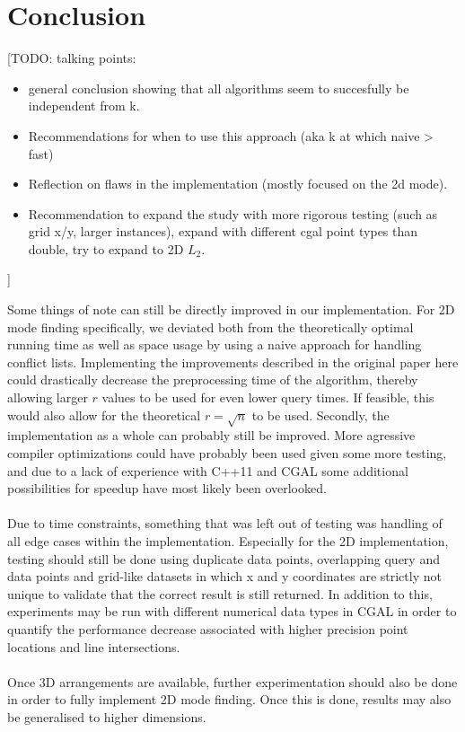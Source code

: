 \documentclass{article}
\newcommand{\todo}[1]{{\color{red}[#1]}}
\newcommand{\fb}[1]{{\color{blue}#1}}
\begin{document}
\section{Conclusion}
\todo{TODO: talking points:
    \begin{itemize}
        \item general conclusion showing that all algorithms seem to succesfully be
              independent from k.
        \item Recommendations for when to use this approach (aka k at which naive > fast)
        \item Reflection on flaws in the implementation (mostly focused on the 2d mode).
        \item Recommendation to expand the study with more rigorous testing (such as grid
              x/y, larger instances), expand with different cgal point types than double, try
              to expand to 2D $L_2$.
    \end{itemize}
}

\fb{
    Some things of note can still be directly improved in our implementation. For 2D mode finding specifically, we deviated both from the theoretically optimal running time as well as space usage by using a naive approach for handling conflict lists. Implementing the improvements described in the original paper here could drastically decrease the preprocessing time of the algorithm, thereby allowing larger $r$ values to be used for even lower query times. If feasible, this would also allow for the theoretical $r=\sqrt{n}$ to be used. Secondly, the implementation as a whole can probably still be improved. More agressive compiler optimizations could have probably been used given some more testing, and due to a lack of experience with C++11 and CGAL some additional possibilities for speedup have most likely been overlooked. \\\\
    Due to time constraints, something that was left out of testing was handling of all edge cases within the implementation. Especially for the 2D implementation, testing should still be done using duplicate data points, overlapping query and data points and grid-like datasets in which x and y coordinates are strictly not unique to validate that the correct result is still returned. In addition to this, experiments may be run with different numerical data types in CGAL in order to quantify the performance decrease associated with higher precision point locations and line intersections. \\\\
    Once 3D arrangements are available, further experimentation should also be done in order to fully implement 2D mode finding. Once this is done, results may also be generalised to higher dimensions.
}
    
\printbibliography
\end{document}
